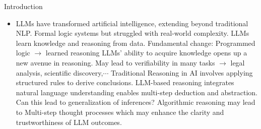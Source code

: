 \begin{frame}{Introduction}
\begin{itemize}
\item LLMs have transformed artificial intelligence, extending beyond traditional NLP.
Formal logic systems but struggled with real-world complexity.
LLMs learn knowledge and reasoning from data.
Fundamental change: Programmed logic $\rightarrow$ learned reasoning
LLMs' ability to acquire knowledge opens up a new avenue in reasoning.
May lead to verifiability in many tasks $\rightarrow$ legal analysis, scientific discovery,$\cdots$
Traditional Reasoning in AI involves applying structured rules to derive conclusions.
LLM-based reasoning  integrates natural language understanding enables multi-step deduction and abstraction.
Can this lead to generalization of inferences?
Algorithmic reasoning may lead to
Multi-step thought processes which may enhance the clarity and trustworthiness of LLM outcomes.

\end{itemize}
\end{frame}